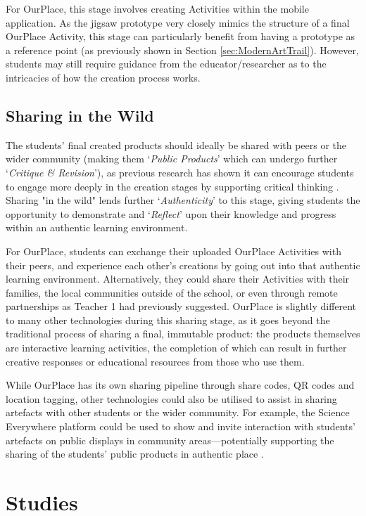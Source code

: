 For OurPlace, this stage involves creating Activities within the mobile application. As the jigsaw prototype very closely mimics the structure of a final OurPlace Activity, this stage can particularly benefit from having a prototype as a reference point (as previously shown in Section \ref{sec:ModernArtTrail}). However, students may still require guidance from the educator/researcher as to the intricacies of how the creation process works.

\subsection{Sharing in the Wild}
The students' final created products should ideally be shared with peers or the wider community (making them `\textit{Public Products}' which can undergo further `\textit{Critique \& Revision}'), as previous research has shown it can encourage students to engage more deeply in the creation stages by supporting critical thinking \citep{Sarangapani2018, Heslop2017}. Sharing "in the wild" lends further `\textit{Authenticity}' to this stage, giving students the opportunity to demonstrate and `\textit{Reflect}' upon their knowledge and progress within an authentic learning environment.

For OurPlace, students can exchange their uploaded OurPlace Activities with their peers, and experience each other's creations by going out into that authentic learning environment. Alternatively, they could share their Activities with their families, the local communities outside of the school, or even through remote partnerships as Teacher 1 had previously suggested. OurPlace is slightly different to many other technologies during this sharing stage, as it goes beyond the traditional process of sharing a final, immutable product: the products themselves are interactive learning activities, the completion of which can result in further creative responses or educational resources from those who use them. 

While OurPlace has its own sharing pipeline through share codes, QR codes and location tagging, other technologies could also be utilised to assist in sharing artefacts with other students or the wider community. For example, the Science Everywhere platform could be used to show and invite interaction with students' artefacts on public displays in community areas---potentially supporting the sharing of the students' public products in authentic place \citep{ahn2018}.

\section{Studies}

